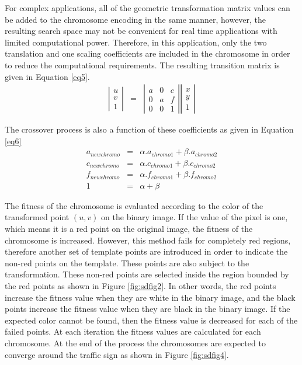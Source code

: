 \documentclass[twocolumn,letterpaper,10pt]{article}
\begin{document}
\par
For complex applications, all of the geometric transformation matrix values can be added to the chromosome encoding in the same manner, however, the resulting search space may not be convenient for real time applications with limited computational power. Therefore, in this application, only the two translation and one scaling coefficients are included in the chromosome in order to reduce the computational requirements. The resulting transition matrix is given in Equation \ref{eq5}.
\begin{eqnarray}
\label{eq5}
\left| \begin{array}{ccc} u \\ v \\ 1 \end{array} \right| &=& 
\left| \begin{array}{ccc} a & 0 & c \\ 0 & a & f \\ 0 & 0 & 1 \end{array} \right| \left| \begin{array}{ccc} x \\ y \\ 1 \end{array} \right|
\end{eqnarray}
\par
The crossover process is also a function of these coefficients as given in Equation \ref{eq6}
\begin{eqnarray}
\label{eq6}
\nonumber a_{newchromo}&=&\alpha.a_{chromo1}+\beta.a_{chromo2} \\
c_{newchromo}&=&\alpha.c_{chromo1}+\beta.c_{chromo2} \\
\nonumber f_{newchromo}&=&\alpha.f_{chromo1}+\beta.f_{chromo2} \\
\nonumber 1&=&\alpha+\beta
\end{eqnarray}
\par
The fitness of the chromosome is evaluated according to the color of the transformed point $(u,v)$ on the binary image. If the value of the pixel is one, which means it is a red point on the original image, the fitness of the chromosome is increased. However, this method fails for completely red regions, therefore another set of template points are introduced in order to indicate the non-red points on the template. These points are also subject to the transformation. These non-red points are selected inside the region bounded by the red points as shown in Figure \ref{fig:sdfig2}. In other words, the red points increase the fitness value when they are white in the binary image, and the black points increase the fitness value when they are black in the binary image. If the expected color cannot be found, then the fitness value is decreased for each of the failed points. At each iteration the fitness values are calculated for each chromosome. At the end of the process the chromosomes are expected to converge around the traffic sign as shown in Figure \ref{fig:sdfig4}.
\end{document}
